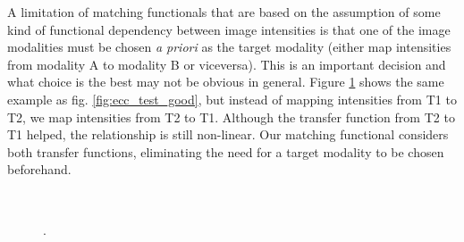 A limitation of matching functionals that are based on the assumption of some kind of functional dependency between image intensities is that one of the image modalities must be chosen \emph{a priori} as the target modality (either map intensities from modality A to modality B or viceversa). This is an important decision and what choice is the best may not be obvious in general. Figure \ref{fig:ecc_test_bad} shows the same example as fig. \ref{fig:ecc_test_good}, but instead of mapping intensities from T1 to T2, we map intensities from T2 to T1. Although the transfer function from T2 to T1 helped, the relationship is still non-linear. Our matching functional considers both transfer functions, eliminating the need for a target modality to be chosen beforehand.\\

\begin{figure}[t!]
\centering
    \\
    \caption{.}
\label{fig:ecc_test_bad}
\end{figure}







